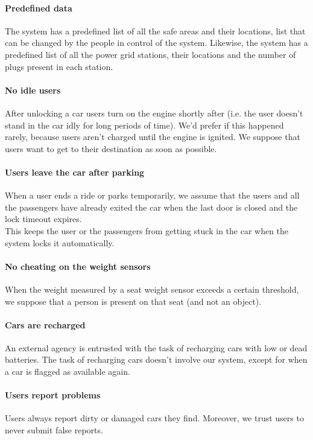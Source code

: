 \documentclass[english]{article}
\begin{document}
\begin{itemize}
\paragraph{Predefined data}
The system has a predefined list of all the safe areas and their locations, list that can be changed by the people in control of the system. Likewise, the system has a predefined list of all the power grid stations, their locations and the number of plugs present in each station.

\paragraph{No idle users}
After unlocking a car users turn on the engine shortly after (i.e. the user doesn't stand in the car idly for long periods of time). We'd prefer if this happened rarely, because users aren't charged until the engine is ignited.
We suppose that users want to get to their destination as soon as possible.

\paragraph{Users leave the car after parking}
When a user ends a ride or parks temporarily, we assume that the users and all the passengers have already exited the car when the last door is closed and the lock timeout expires. \\
This keeps the user or the passengers from getting stuck in the car when the system locks it automatically.

\paragraph{No cheating on the weight sensors}
When the weight measured by a seat weight sensor exceeds a certain threshold, we suppose that a person is present on that seat (and not an object).

\paragraph{Cars are recharged}
An external agency is entrusted with the task of recharging cars with low or dead batteries. The task of recharging cars doesn't involve our system, except for when a car is flagged as available again.

\paragraph{Users report problems}
Users always report dirty or damaged cars they find. Moreover, we trust users to never submit false reports.


\end{itemize}
\end{document}
